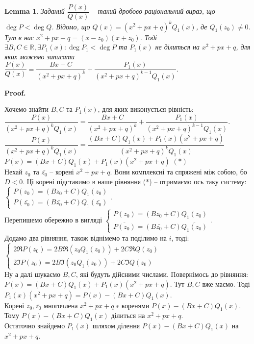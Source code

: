 \documentclass[a4paper, 10pt]{extarticle}
\makeatletter
\def\qed{$\blacksquare$}
\def\qed{$\blacksquare$}
\theoremstyle{theoremdd}
\theoremstyle{theoremdd}
\theoremstyle{theoremdd}
\theoremstyle{theoremdd}
\theoremstyle{theoremdd}
\theoremstyle{theoremdd}
\theoremstyle{theoremdd}
\newtheorem{lemma}[theorem]{Lemma}
\theoremstyle{theoremdd}
\renewenvironment{proof}[1][Proof.\\]{\par
\pushQED{\hfill \qed}%
\normalfont \topsep6\p@\@plus6\p@\relax
\trivlist
\item\relax
{\bfseries
#1\@addpunct{.}}\hspace\labelsep\ignorespaces
}{%
\popQED\endtrivlist\@endpefalse
}
\makeatother
\begin{document}
\begin{lemma}
Заданий $\dfrac{P(x)}{Q(x)}$ -- такий дробово-раціональний вираз, що $\deg P < \deg Q$. Відомо, що $Q(x) = (x^2+px+q)^kQ_1(x)$, де $Q_1(z_0) \neq 0$. Тут в нас $x^2+px+q = (x-z_0)(x+\bar{z_0})$. Тоді $\exists B,C \in \mathbb{R}, \exists P_1(x): \deg P_1 < \deg P$ та $P_1(x)$ не ділиться на $x^2+px+q$, для яких можемо записати\\
$\dfrac{P(x)}{Q(x)} = \dfrac{Bx+C}{(x^2+px+q)^k} + \dfrac{P_1(x)}{(x^2+px+q)^{k-1}Q_1(x)}$.
\end{lemma}

\begin{proof}
Хочемо знайти $B,C$ та $P_1(x)$, для яких виконується рівність:\\
$\dfrac{P(x)}{(x^2+px+q)^k Q_1(x)} = \dfrac{Bx+C}{(x^2+px+q)^k} + \dfrac{P_1(x)}{(x^2+px+q)^{k-1}Q_1(x)}$.\\
$\dfrac{P(x)}{(x^2+px+q)^k Q_1(x)} = \dfrac{(Bx+C)Q_1(x)+P_1(x)(x^2+px+q)}{(x^2+px+q)^k Q_1(x)}$\\
$P(x) = (Bx+C)Q_1(x)+P_1(x)(x^2+px+q)$ $(*)$\\
Нехай $z_0$ та $\bar{z_0}$ -- корені $x^2+px+q$. Вони комплексні та спряжені між собою, бо $D < 0$. Ці корені підставимо в наше рівняння (*) -- отримаємо ось таку систему:
$\begin{cases} 
P(z_0) = (Bz_0+C)Q_1(z_0) \\
P(\bar{z_0}) = (B\bar{z_0}+C) Q_1(\bar{z_0})
\end{cases}$.\\
Перепишемо обережно в вигляді $\begin{cases} 
P(z_0) = (Bz_0+C)Q_1(z_0) \\
\overline{P(z_0)} = (B\bar{z_0}+C) \overline{Q_1(z_0)}
\end{cases}$.\\
Додамо два рівняння, також віднімемо та поділимо на $i$, тоді:\\
$\begin{cases}
2 \Re P(z_0) = 2B \Re (z_0 Q_1(z_0)) + 2C \Re Q(z_0) \\
2 \Im P(z_0) = 2B \Im(z_0 Q_1(z_0)) + 2C \Im Q(z_0)
\end{cases}
$\\
Ну а далі шукаємо $B,C$, які будуть дійсними числами. Повернімось до рівняння:\\
$P(x) = (Bx+C)Q_1(x) + P_1(x)(x^2+px+q)$. Тут $B,C$ вже маємо. Тоді\\
$P_1(x)(x^2+px+q) = P(x) - (Bx+C)Q_1(x)$.\\
Корені $z_0, \bar{z_0}$ многочлена $x^2+px+q$ є коренями $P(x)-(Bx+C)Q_1(x)$. Тому $P(x) - (Bx+C)Q_1(x)$ ділиться на $x^2+px+q$.\\
Остаточно знайдемо $P_1(x)$ шляхом ділення $P(x) - (Bx+C)Q_1(x)$ на $x^2+px+q$.
\end{proof}
\end{document}
